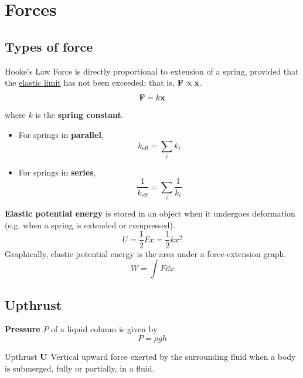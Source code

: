 \section{Forces}
\subsection{Types of force}
\begin{defn}{Hooke's Law}{}
Force is directly proportional to extension of a spring, provided that the \underline{elastic limit} has not been exceeded; that is, $\vb{F}\propto\vb{x}$.
\begin{equation}
\vb{F}=k\vb{x}
\end{equation}
where $k$ is the \textbf{spring constant}.
\end{defn}

\begin{itemize}
\item For springs in \textbf{parallel}, 
\begin{equation} k_{\text{eff}} = \sum_{i} k_i \end{equation}
\item For springs in \textbf{series},
\begin{equation} \frac{1}{k_{\text{eff}}} = \sum_{i} \frac{1}{k_i} \end{equation}
\end{itemize}

\textbf{Elastic potential energy} is stored in an object when it undergoes deformation (e.g. when a spring is extended or compressed).
\begin{equation} U = \frac{1}{2}Fx = \frac{1}{2}kx^2 \end{equation}
Graphically, elastic potential energy is the area under a force-extension graph.
\[ W = \int F \dd{x} \]

\subsection{Upthrust}
\textbf{Pressure} $P$ of a liquid column is given by 
\begin{equation}
P=\rho gh
\end{equation}


\begin{defn}{Upthrust $\vb{U}$}{}
Vertical upward force exerted by the surrounding fluid when a body is submerged, fully or partially, in a fluid.
\end{defn} 

